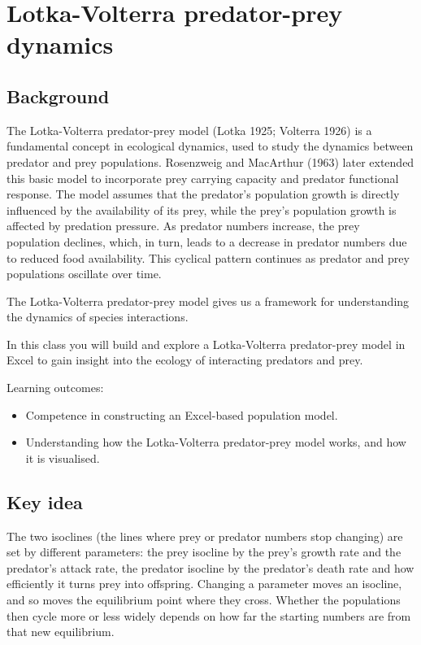 \documentclass[
  a4paper]{book}
\providecommand{\tightlist}{%
  \setlength{\itemsep}{0pt}\setlength{\parskip}{0pt}}
\begin{document}
\chapter{Lotka-Volterra predator-prey dynamics}\label{lotka-volterra-predator-prey-dynamics}

\section{Background}\label{background-17}

The Lotka-Volterra predator-prey model (Lotka 1925; Volterra 1926) is a fundamental concept in ecological dynamics, used to study the dynamics between predator and prey populations. Rosenzweig and MacArthur (1963) later extended this basic model to incorporate prey carrying capacity and predator functional response. The model assumes that the predator's population growth is directly influenced by the availability of its prey, while the prey's population growth is affected by predation pressure. As predator numbers increase, the prey population declines, which, in turn, leads to a decrease in predator numbers due to reduced food availability. This cyclical pattern continues as predator and prey populations oscillate over time.

The Lotka-Volterra predator-prey model gives us a framework for understanding the dynamics of species interactions.

In this class you will build and explore a Lotka-Volterra predator-prey model in Excel to gain insight into the ecology of interacting predators and prey.

Learning outcomes:

\begin{itemize}
\tightlist
\item
  Competence in constructing an Excel-based population model.
\item
  Understanding how the Lotka-Volterra predator-prey model works, and how it is visualised.
\end{itemize}

\section{Key idea}\label{key-idea-2}

The two isoclines (the lines where prey or predator numbers stop changing) are set by different parameters: the prey isocline by the prey's growth rate and the predator's attack rate, the predator isocline by the predator's death rate and how efficiently it turns prey into offspring. Changing a parameter moves an isocline, and so moves the equilibrium point where they cross. Whether the populations then cycle more or less widely depends on how far the starting numbers are from that new equilibrium.
\end{document}
